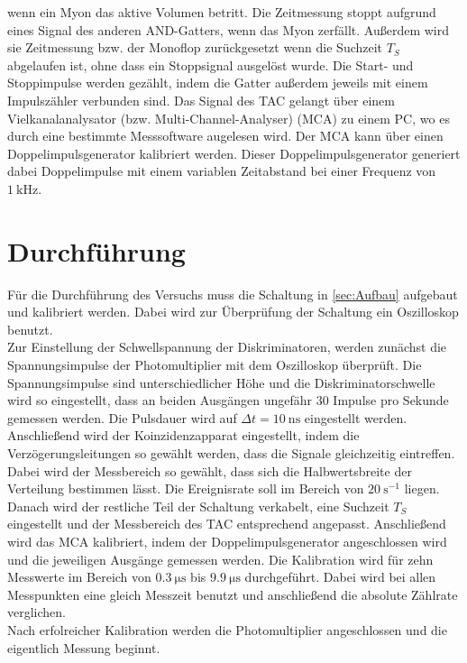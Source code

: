 wenn ein Myon das aktive Volumen betritt. Die Zeitmessung stoppt aufgrund eines Signal des anderen AND-Gatters, wenn das Myon zerfällt. 
Außerdem wird sie Zeitmessung bzw. der Monoflop zurückgesetzt wenn die Suchzeit $T_S$ abgelaufen ist, ohne dass ein Stoppsignal ausgelöst wurde.
Die Start- und Stoppimpulse werden gezählt, indem die Gatter außerdem jeweils mit einem Impulszähler verbunden sind.
Das Signal des TAC gelangt über einem Vielkanalanalysator (bzw. Multi-Channel-Analyser) (MCA) zu einem PC, wo es durch eine bestimmte Messsoftware augelesen wird.
Der MCA kann über einen Doppelimpulsgenerator kalibriert werden. Dieser Doppelimpulsgenerator generiert dabei Doppelimpulse mit einem variablen Zeitabstand bei einer Frequenz von $\qty{1}{\kilo\Hz}$.


\section{Durchführung}
\label{sec:Durchführung}
Für die Durchführung des Versuchs muss die Schaltung in \autoref{sec:Aufbau} aufgebaut und kalibriert werden.
Dabei wird zur Überprüfung der Schaltung ein Oszilloskop benutzt.\\
Zur Einstellung der Schwellspannung der Diskriminatoren, werden zunächst die Spannungsimpulse der Photomultiplier mit dem Oszilloskop überprüft.
Die Spannungsimpulse sind unterschiedlicher Höhe und die Diskriminatorschwelle wird so eingestellt, dass an beiden Ausgängen ungefähr $30$ Impulse pro Sekunde gemessen werden.
Die Pulsdauer wird auf $\Delta t = \qty{10}{\nano\second}$ eingestellt werden.\\
Anschließend wird der Koinzidenzapparat eingestellt, indem die Verzögerungsleitungen so gewählt werden, dass die Signale gleichzeitig eintreffen. Dabei wird der Messbereich so gewählt,
dass sich die Halbwertsbreite der Verteilung bestimmen lässt. Die Ereignisrate soll im Bereich von $\qty{20}{\second^{-1}}$ liegen.\\
Danach wird der restliche Teil der Schaltung verkabelt, eine Suchzeit $T_S$ eingestellt und der Messbereich des TAC entsprechend angepasst.
Anschließend wird das MCA kalibriert, indem der Doppelimpulsgenerator angeschlossen wird und die jeweiligen Ausgänge gemessen werden. Die Kalibration wird für zehn Messwerte im Bereich von
$\qty{0.3}{\micro\second}$ bis  $\qty{9.9}{\micro\second}$ durchgeführt. Dabei wird bei allen Messpunkten eine gleich Messzeit benutzt und anschließend die absolute Zählrate verglichen.\\
Nach erfolreicher Kalibration werden die Photomultiplier angeschlossen und die eigentlich Messung beginnt.

